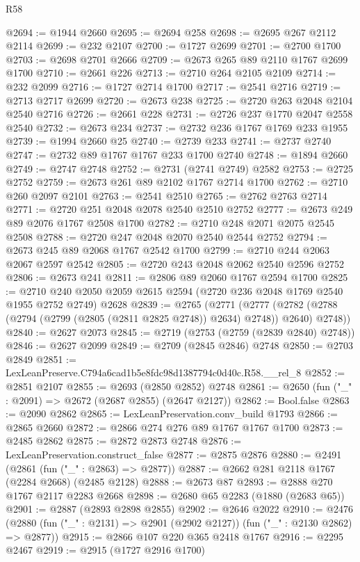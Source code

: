 \begin{lexlean}{R58}
\begin{coremodule}
@2694 := @1944 @2660
@2695 := @2694 @258
@2698 := @2695 @267 @2112 @2114
@2699 := @232 @2107
@2700 := @1727 @2699
@2701 := @2700 @1700
@2703 := @2698 @2701 @2666
@2709 := @2673 @265 @89 @2110 @1767 @2699 @1700
@2710 := @2661 @226
@2713 := @2710 @264 @2105 @2109
@2714 := @232 @2099
@2716 := @1727 @2714 @1700
@2717 := @2541 @2716
@2719 := @2713 @2717 @2699
@2720 := @2673 @238
@2725 := @2720 @263 @2048 @2104 @2540 @2716
@2726 := @2661 @228
@2731 := @2726 @237 @1770 @2047 @2558 @2540
@2732 := @2673 @234
@2737 := @2732 @236 @1767 @1769 @233 @1955
@2739 := @1994 @2660 @25
@2740 := @2739 @233
@2741 := @2737 @2740
@2747 := @2732 @89 @1767 @1767 @233 @1700 @2740
@2748 := @1894 @2660
@2749 := @2747 @2748
@2752 := @2731 (@2741 @2749) @2582
@2753 := @2725 @2752
@2759 := @2673 @261 @89 @2102 @1767 @2714 @1700
@2762 := @2710 @260 @2097 @2101
@2763 := @2541 @2510
@2765 := @2762 @2763 @2714
@2771 := @2720 @251 @2048 @2078 @2540 @2510 @2752
@2777 := @2673 @249 @89 @2076 @1767 @2508 @1700
@2782 := @2710 @248 @2071 @2075 @2545 @2508
@2788 := @2720 @247 @2048 @2070 @2540 @2544 @2752
@2794 := @2673 @245 @89 @2068 @1767 @2542 @1700
@2799 := @2710 @244 @2063 @2067 @2597 @2542
@2805 := @2720 @243 @2048 @2062 @2540 @2596 @2752
@2806 := @2673 @241
@2811 := @2806 @89 @2060 @1767 @2594 @1700
@2825 := @2710 @240 @2050 @2059 @2615 @2594 (@2720 @236 @2048 @1769 @2540 @1955 @2752 @2749) @2628
@2839 := @2765
    (@2771
      (@2777 (@2782 (@2788 (@2794 (@2799 (@2805 (@2811 @2825 @2748)) @2634) @2748)) @2640) @2748))
@2840 := @2627 @2073
@2845 := @2719 (@2753 (@2759 (@2839 @2840) @2748))
@2846 := @2627 @2099
@2849 := @2709 (@2845 @2846) @2748
@2850 := @2703 @2849
@2851 := LexLeanPreserve.C794a6cad1b5e8fdc98d1387794c0d40c.R58.__rel_8
@2852 := @2851 @2107
@2855 := @2693 (@2850 @2852) @2748
@2861 := @2650 (fun ("_" : @2091) => @2672 (@2687 @2855) (@2647 @2127))
@2862 := Bool.false
@2863 := @2090 @2862
@2865 := LexLeanPreservation.conv_build @1793
@2866 := @2865 @2660
@2872 := @2866 @274 @276 @89 @1767 @1767 @1700
@2873 := @2485 @2862
@2875 := @2872 @2873 @2748
@2876 := LexLeanPreservation.construct_false
@2877 := @2875 @2876
@2880 := @2491 (@2861 (fun ("_" : @2863) => @2877))
@2887 := @2662 @281 @2118 @1767 (@2284 @2668) (@2485 @2128)
@2888 := @2673 @87
@2893 := @2888 @270 @1767 @2117 @2283 @2668
@2898 := @2680 @65 @2283 (@1880 (@2683 @65))
@2901 := @2887 (@2893 @2898 @2855)
@2902 := @2646 @2022
@2910 := @2476 (@2880 (fun ("_" : @2131) => @2901 (@2902 @2127)) (fun ("_" : @2130 @2862) => @2877))
@2915 := @2866 @107 @220 @365 @2418 @1767
@2916 := @2295 @2467
@2919 := @2915 (@1727 @2916 @1700)

\end{coremodule}
\end{lexlean}
